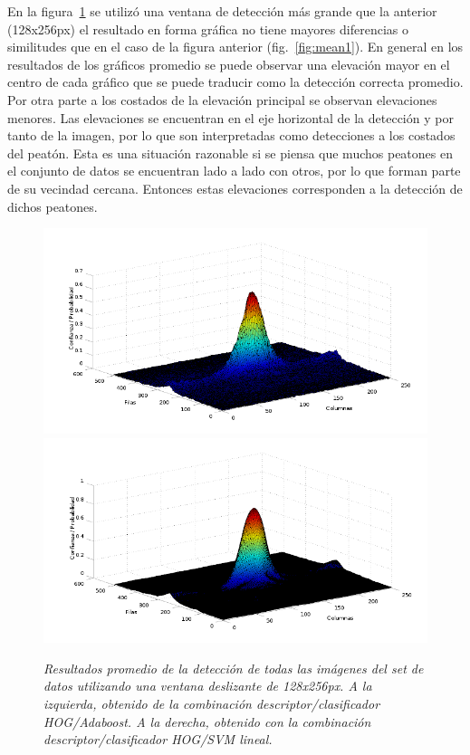 En la figura~\ref{fig:mean2} se utilizó una ventana de detección más grande que la anterior (128x256px) el resultado en forma gráfica no tiene mayores diferencias o similitudes que en el caso de la figura anterior (fig.~\ref{fig:mean1}).
En general en los resultados de los gráficos promedio se puede observar una elevación mayor en el centro de cada gráfico que se puede traducir como la detección correcta promedio. Por otra parte a los costados de la elevación principal se observan elevaciones menores. Las elevaciones se encuentran en el eje horizontal de la detección y por tanto de la imagen, por lo que son interpretadas como detecciones a los costados del peatón. Esta es una situación razonable si se piensa que muchos peatones en el conjunto de datos se encuentran lado a lado con otros, por lo que forman parte de su vecindad cercana. Entonces estas elevaciones corresponden a la detección de dichos peatones. 

\begin{figure}[htc]
  \centering
  \includegraphics[scale=.25]{images/mean/boost/128}
  \includegraphics[scale=.25]{images/mean/svm/128}
  \caption{\em  Resultados promedio de la detección de todas las imágenes del set de datos utilizando una ventana deslizante de 128x256px. A la izquierda, obtenido de la combinación descriptor/clasificador HOG/Adaboost. A la derecha, obtenido con la combinación descriptor/clasificador HOG/SVM lineal.}  
  \label{fig:mean2}
\end{figure}

